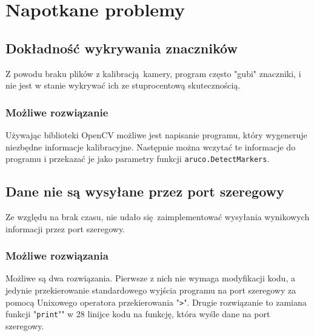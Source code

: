 \section{Napotkane problemy}
\subsection{Dokładność wykrywania znaczników}

Z powodu braku plików z kalibracją kamery, program często "gubi" znaczniki, i nie jest w stanie
wykrywać ich ze stuprocentową skutecznością.

\subsubsection{Możliwe rozwiązanie}

Używając biblioteki OpenCV możliwe jest napisanie programu, który wygeneruje niezbędne informacje
kalibracyjne. Następnie można wczytać te informacje do programu i przekazać je jako parametry
funkcji \verb`aruco.DetectMarkers`.

\subsection{Dane nie są wysyłane przez port szeregowy}

Ze względu na brak czasu, nie udało się zaimplementować wysyłania wynikowych informacji przez port
szeregowy.

\subsubsection{Możliwe rozwiązania}

Możliwe są dwa rozwiązania. Pierwsze z nich nie wymaga modyfikacji kodu, a jedynie przekierowanie
standardowego wyjścia programu na port szeregowy za pomocą Unixowego operatora przekierowania
"\verb`>`". Drugie rozwiązanie to zamiana funkcji "\verb`print`"" w 28 linijce kodu na funkcję, 
która wyśle dane na port szeregowy.
